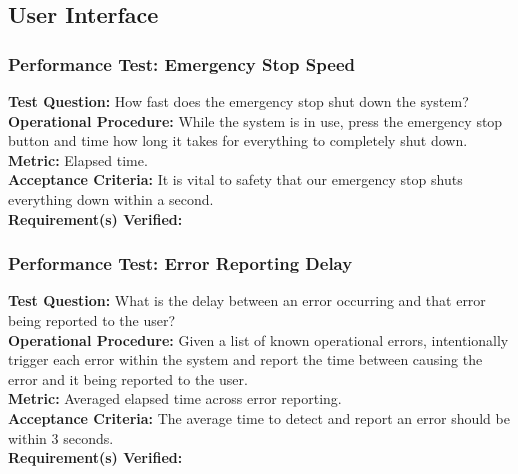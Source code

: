 
\subsection{User Interface}
\label{sec:verification_ui}

\subsubsection{Performance Test: Emergency Stop Speed}
\label{sec:ui_pt_stop_speed}
\textbf{Test Question:} How fast does the emergency stop shut down the system? \\
\textbf{Operational Procedure:} While the system is in use, press the emergency stop button and time how long it takes for everything to completely shut down.\\
\textbf{Metric:} Elapsed time. \\
\textbf{Acceptance Criteria:} It is vital to safety that our emergency stop shuts everything down within a second. \\
\textbf{Requirement(s) Verified:}  

\subsubsection{Performance Test: Error Reporting Delay}
\label{sec:ui_pt_error_delay}
\textbf{Test Question:} What is the delay between an error occurring and that error being reported to the user? \\
\textbf{Operational Procedure:} Given a list of known operational errors, intentionally trigger each error within the system and report the time between causing the error and it being reported to the user. \\
\textbf{Metric:} Averaged elapsed time across error reporting. \\
\textbf{Acceptance Criteria:} The average time to detect and report an error should be within 3 seconds. \\
\textbf{Requirement(s) Verified:}  

